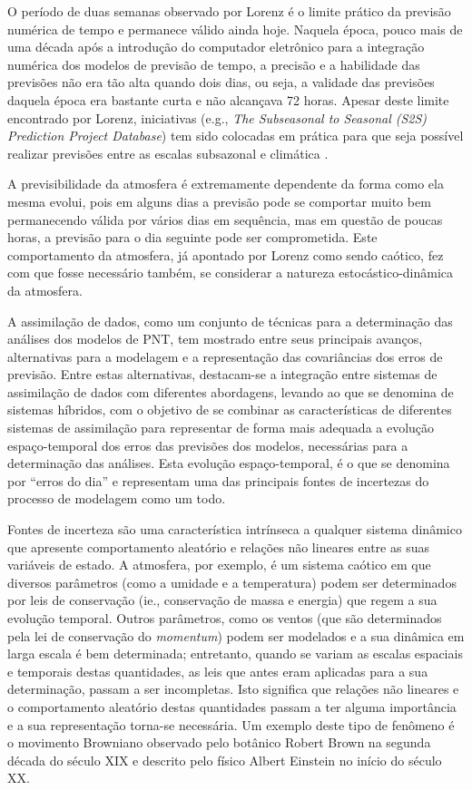 O período de duas semanas observado por Lorenz é o limite prático da previsão numérica de tempo e permanece válido ainda hoje. Naquela época, pouco mais de uma década após a introdução do computador eletrônico para a integração numérica dos modelos de previsão de tempo, a precisão e a habilidade das previsões não era tão alta quando dois dias, ou seja, a validade das previsões daquela época era bastante curta e não alcançava 72 horas. Apesar deste limite encontrado por Lorenz, iniciativas (e.g., \textit{The Subseasonal to Seasonal (S2S) Prediction Project Database}) tem sido colocadas em prática para que seja possível realizar previsões entre as escalas subsazonal e climática \cite{vitaretal/2017}.

A previsibilidade da atmosfera é extremamente dependente da forma como ela mesma evolui, pois em alguns dias a previsão pode se comportar muito bem permanecendo válida por vários dias em sequência, mas em questão de poucas horas, a previsão para o dia seguinte pode ser comprometida. Este comportamento da atmosfera, já apontado por Lorenz como sendo caótico, fez com que fosse necessário também, se considerar a natureza estocástico-dinâmica da atmosfera.

A assimilação de dados, como um conjunto de técnicas para a determinação das análises dos modelos de PNT, tem mostrado entre seus principais avanços, alternativas para a modelagem e a representação das covariâncias dos erros de previsão. Entre estas alternativas, destacam-se a integração entre sistemas de assimilação de dados com diferentes abordagens, levando ao que se denomina de sistemas híbridos, com o objetivo de se combinar as características de diferentes sistemas de assimilação para representar de forma mais adequada a evolução espaço-temporal dos erros das previsões dos modelos, necessárias para a determinação das análises. Esta evolução espaço-temporal, é o que se denomina por ``erros do dia'' e representam uma das principais fontes de incertezas do processo de modelagem como um todo.

Fontes de incerteza são uma característica intrínseca a qualquer sistema dinâmico que apresente comportamento aleatório e relações não lineares entre as suas variáveis de estado. A atmosfera, por exemplo, é um sistema caótico em que diversos parâmetros (como a umidade e a temperatura) podem ser determinados por leis de conservação (ie., conservação de massa e energia) que regem a sua evolução temporal. Outros parâmetros, como os ventos (que são determinados pela lei de conservação do \textit{momentum}) podem ser modelados e a sua dinâmica em larga escala é bem determinada; entretanto, quando se variam as escalas espaciais e temporais destas quantidades, as leis que antes eram aplicadas para a sua determinação, passam a ser incompletas. Isto significa que relações não lineares e o comportamento aleatório destas quantidades passam a ter alguma importância e a sua representação torna-se necessária. Um exemplo deste tipo de fenômeno é o movimento Browniano observado pelo botânico Robert Brown na segunda década do século XIX e descrito pelo físico Albert Einstein no início do século XX.

